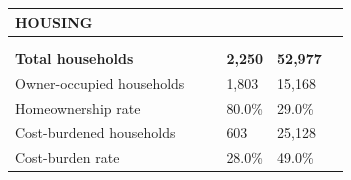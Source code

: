 \documentclass[9pt]{report}
\begin{document}
\vspace{12pt}
\setlength{\tabcolsep}{.01in} %
\begin{tabular}{p{.10in}p{.10in}p{.10in}p{3.7in}>{\hfill}p{.85in}>{\hfill}p{.85in}>{\hfill}p{.85in}>{\hfill}p{.85in}p{0.1in}}
\multicolumn{9}{l}{\parbox{7.1in}{\raggedright{\large{\strut\textbf{HOUSING}\strut}}}} \\ 
\hline
\multicolumn{4}{l}{\parbox{3.5in}{\raggedright{\textbf{}}}} & \multicolumn{1}{r}{\parbox{.85in}{\strut\raggedleft{\textbf{}\strut}}} & \multicolumn{1}{r}{\parbox{.85in}{\strut\raggedleft{\textbf{}\strut}}} & \multicolumn{1}{r}{\parbox{.85in}{\strut{}}} & \multicolumn{1}{r}{\parbox{.85in}{\strut{}}} & \\ 
\multicolumn{9}{l}{} \\ 
\multicolumn{4}{l}{\parbox{3.5in}{\strut\raggedright{\textbf{Total households}\strut}}} & \textbf{} & \textbf{} & \textbf{2,250} & \textbf{52,977} & \textbf{} \\ 
\multicolumn{4}{l}{\parbox{3.6in}{\strut\raggedright{{Owner-occupied households}}\strut}} &  &  & 1,803 & 15,168 & \multicolumn{1}{l}{}  \\ 
\multicolumn{4}{l}{\parbox{3.6in}{\strut\raggedright{{Homeownership rate}}\strut}} &  &  & 80.0\% & 29.0\% & \multicolumn{1}{l}{}  \\ 
\multicolumn{4}{l}{\parbox{3.6in}{\strut\raggedright{{Cost-burdened households}}\strut}} &  &  & 603 & 25,128 & \multicolumn{1}{l}{}  \\ 
\multicolumn{4}{l}{\parbox{3.6in}{\strut\raggedright{{Cost-burden rate}}\strut}} &  &  & 28.0\% & 49.0\% & \multicolumn{1}{l}{}  \\ 

\end{tabular}
\setlength{\tabcolsep}{6pt} %
\end{document}
